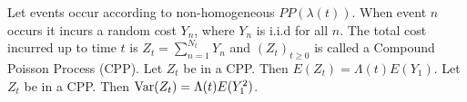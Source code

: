  Let events occur according to non-homogeneous $PP(\lambda(t))$. When event $n$ occurs it incurs a random cost $Y_n$, where $Y_n$ is i.i.d for all $n$. The total cost incurred up to time $t$ is 
$Z_t = \sum^{N_t}_{n=1} Y_n$ 
and $(Z_t)_{t \ge 0}$ is called a Compound Poisson Process (CPP).
 Let $Z_t$ be in a CPP. Then 
$E(Z_t) = \Lambda(t)E(Y_1)$.
 Let $Z_t$ be in a CPP. Then 
$\operatorname{Var}(Z_t) = \Lambda(t)E(Y^2_1)$.